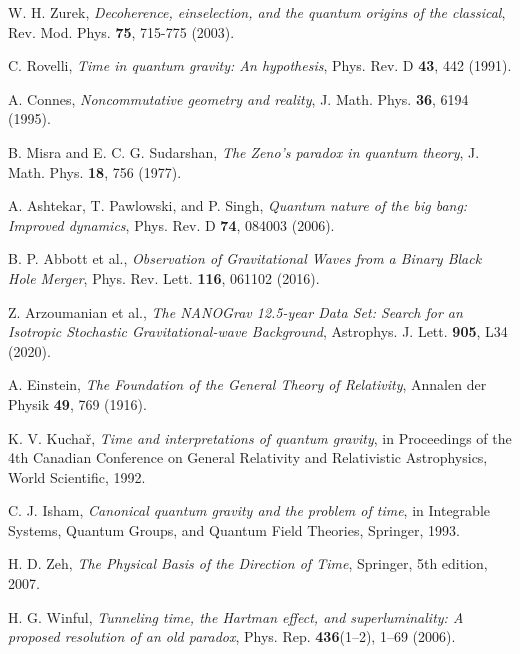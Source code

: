\documentclass[12pt,a4paper]{article}
\numberwithin{equation}{section}
\begin{document}

\begin{thebibliography}{99}

W. H. Zurek, \emph{Decoherence, einselection, and the quantum origins of the classical}, Rev. Mod. Phys. \textbf{75}, 715-775 (2003).

C. Rovelli, \emph{Time in quantum gravity: An hypothesis}, Phys. Rev. D \textbf{43}, 442 (1991).

A. Connes, \emph{Noncommutative geometry and reality}, J. Math. Phys. \textbf{36}, 6194 (1995).

B. Misra and E. C. G. Sudarshan, \emph{The Zeno's paradox in quantum theory}, J. Math. Phys. \textbf{18}, 756 (1977).

A. Ashtekar, T. Pawlowski, and P. Singh, \emph{Quantum nature of the big bang: Improved dynamics}, Phys. Rev. D \textbf{74}, 084003 (2006).

B. P. Abbott et al., \emph{Observation of Gravitational Waves from a Binary Black Hole Merger}, Phys. Rev. Lett. \textbf{116}, 061102 (2016).

Z. Arzoumanian et al., \emph{The NANOGrav 12.5-year Data Set: Search for an Isotropic Stochastic Gravitational-wave Background}, Astrophys. J. Lett. \textbf{905}, L34 (2020).

A. Einstein, \emph{The Foundation of the General Theory of Relativity}, Annalen der Physik \textbf{49}, 769 (1916).

K. V. Kuchař, \emph{Time and interpretations of quantum gravity}, in Proceedings of the 4th Canadian Conference on General Relativity and Relativistic Astrophysics, World Scientific, 1992.

C. J. Isham, \emph{Canonical quantum gravity and the problem of time}, in Integrable Systems, Quantum Groups, and Quantum Field Theories, Springer, 1993.

H. D. Zeh, \emph{The Physical Basis of the Direction of Time}, Springer, 5th edition, 2007.

H. G. Winful, \emph{Tunneling time, the Hartman effect, and superluminality: A proposed resolution of an old paradox}, Phys. Rep. \textbf{436}(1–2), 1–69 (2006).


\end{thebibliography}
\end{document}
